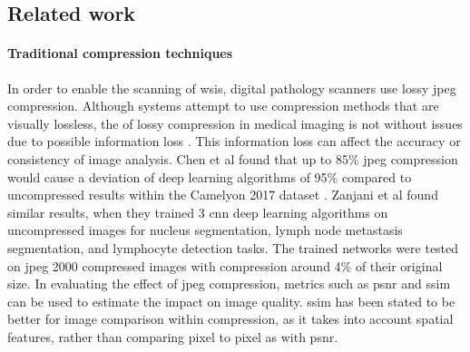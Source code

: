 \documentclass[review]{elsarticle}
\begin{document}
\subsection{Related work}
\paragraph{Traditional compression techniques}
In order to enable the scanning of \glspl{wsi}, digital pathology scanners use lossy \gls{jpeg} compression. Although systems attempt to use compression methods that are visually lossless, the of lossy compression in medical imaging is not without issues due to possible information loss \cite{ghazvinian_zanjani_impact_2019}. This information loss can affect the accuracy or consistency of image analysis. Chen et al found that up to 85\% \gls{jpeg} compression would cause a deviation of deep learning algorithms of 95\% compared to uncompressed results within the Camelyon 2017 dataset \cite{chen_quantitative_2020}. Zanjani et al \cite{ghazvinian_zanjani_impact_2019} found similar results, when they trained 3 \gls{cnn} deep learning algorithms on uncompressed images for nucleus segmentation, lymph node metastasis segmentation, and lymphocyte detection tasks. The trained networks were tested on \gls{jpeg} 2000 compressed images with compression around 4\% of their original size. %
In evaluating the effect of \gls{jpeg} compression, metrics such as \gls{psnr} and \gls{ssim} can be used to estimate the impact on image quality. \gls{ssim} has been stated to be better for image comparison within compression, as it takes into account spatial features, rather than comparing pixel to pixel as with \gls{psnr}.

\end{document}
